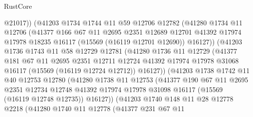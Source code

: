 \begin{lexlean}{RustCore}
\begin{coremodule}
                  @21017))
              (@41203
                @1734
                @1744
                @11
                @59
                @12706
                @12782
                (@41280
                  @1734
                  @11
                  @12706
                  (@41377
                    @166
                    @67
                    @11
                    @2695
                    @2351
                    @12689
                    @12701
                    @41392
                    @17974
                    @17978
                    @18235
                    @16117
                    (@15569 (@16119 @12701 @12690))
                    @16127))
                (@41203
                  @1736
                  @1743
                  @11
                  @58
                  @12729
                  @12781
                  (@41280
                    @1736
                    @11
                    @12729
                    (@41377
                      @181
                      @67
                      @11
                      @2695
                      @2351
                      @12711
                      @12724
                      @41392
                      @17974
                      @17978
                      @31068
                      @16117
                      (@15569 (@16119 @12724 @12712))
                      @16127))
                  (@41203
                    @1738
                    @1742
                    @11
                    @40
                    @12753
                    @12780
                    (@41280
                      @1738
                      @11
                      @12753
                      (@41377
                        @190
                        @67
                        @11
                        @2695
                        @2351
                        @12734
                        @12748
                        @41392
                        @17974
                        @17978
                        @31098
                        @16117
                        (@15569 (@16119 @12748 @12735))
                        @16127))
                    (@41203
                      @1740
                      @148
                      @11
                      @28
                      @12778
                      @2218
                      (@41280
                        @1740
                        @11
                        @12778
                        (@41377
                          @231
                          @67
                          @11

\end{coremodule}
\end{lexlean}
